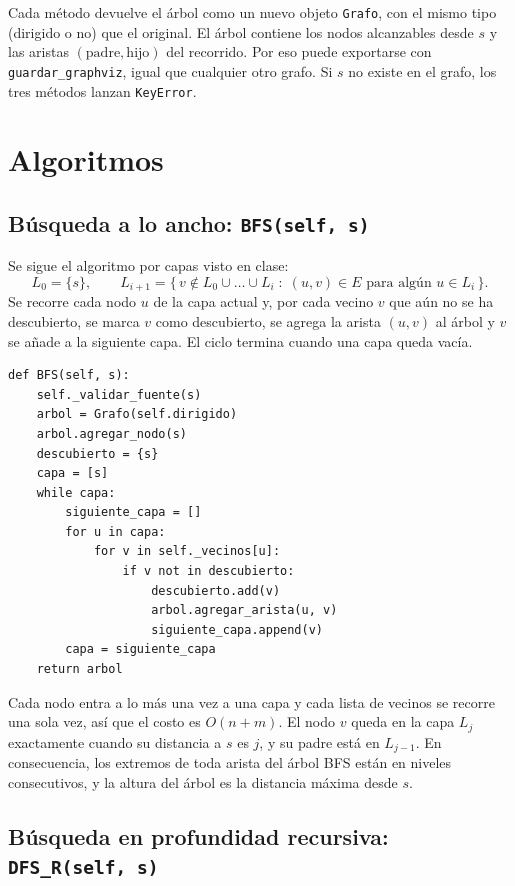 \documentclass[11pt,letterpaper]{article}
\begin{document}
Cada método devuelve el árbol como un nuevo objeto \texttt{Grafo}, con el mismo
tipo (dirigido o no) que el original. El árbol contiene los nodos alcanzables desde
$s$ y las aristas $(\text{padre}, \text{hijo})$ del recorrido. Por eso puede
exportarse con \texttt{guardar\_graphviz}, igual que cualquier otro grafo. Si $s$
no existe en el grafo, los tres métodos lanzan \texttt{KeyError}.

\section{Algoritmos}

\subsection{Búsqueda a lo ancho: \texttt{BFS(self, s)}}

Se sigue el algoritmo por capas visto en clase:
\[
    L_0 = \{s\}, \qquad
    L_{i+1} = \{\, v \notin L_0 \cup \dots \cup L_i \;:\; (u, v) \in E
                 \text{ para algún } u \in L_i \,\}.
\]
Se recorre cada nodo $u$ de la capa actual y, por cada vecino $v$ que aún no se ha
descubierto, se marca $v$ como descubierto, se agrega la arista $(u, v)$ al árbol y
$v$ se añade a la siguiente capa. El ciclo termina cuando una capa queda vacía.

\begin{lstlisting}[caption={Método \texttt{BFS}.}]
def BFS(self, s):
    self._validar_fuente(s)
    arbol = Grafo(self.dirigido)
    arbol.agregar_nodo(s)
    descubierto = {s}
    capa = [s]
    while capa:
        siguiente_capa = []
        for u in capa:
            for v in self._vecinos[u]:
                if v not in descubierto:
                    descubierto.add(v)
                    arbol.agregar_arista(u, v)
                    siguiente_capa.append(v)
        capa = siguiente_capa
    return arbol
\end{lstlisting}

Cada nodo entra a lo más una vez a una capa y cada lista de vecinos se recorre una
sola vez, así que el costo es $O(n + m)$. El nodo $v$ queda en la capa $L_j$
exactamente cuando su distancia a $s$ es $j$, y su padre está en $L_{j-1}$. En
consecuencia, los extremos de toda arista del árbol BFS están en niveles
consecutivos, y la altura del árbol es la distancia máxima desde $s$.

\subsection{Búsqueda en profundidad recursiva: \texttt{DFS\_R(self, s)}}
\end{document}
